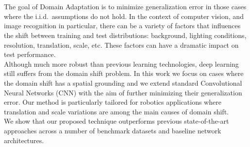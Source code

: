 \documentclass[../main.tex]{subfiles}
\begin{document}
    \section*{}
    \begin{doublespace}
    The goal of Domain Adaptation is to minimize generalization error in those cases where the
    i.i.d.\ assumptions do not hold. In the context of computer vision, and image recognition
    in particular, there can be a variety of factors that influences the shift between
    training and test distributions: background, lighting conditions, resolution, translation, scale, etc.
    These factors can have a dramatic impact on test performance. \\
    Although much more robust than previous learning technologies, deep learning still suffers from the
    domain shift problem.
    In this work we focus on cases where the domain shift has a spatial grounding and we extend standard
    Convolutional Neural Networks (CNN) with the aim of further minimizing their generalization error.
    Our method is particularly tailored for robotics applications where translation and scale variations
    are among the main causes of domain shift. \\
    We show that our proposed technique outperforms previous state-of-the-art approaches across a number
    of benchmark datasets and baseline network architectures.
    \end{doublespace}
\end{document}
